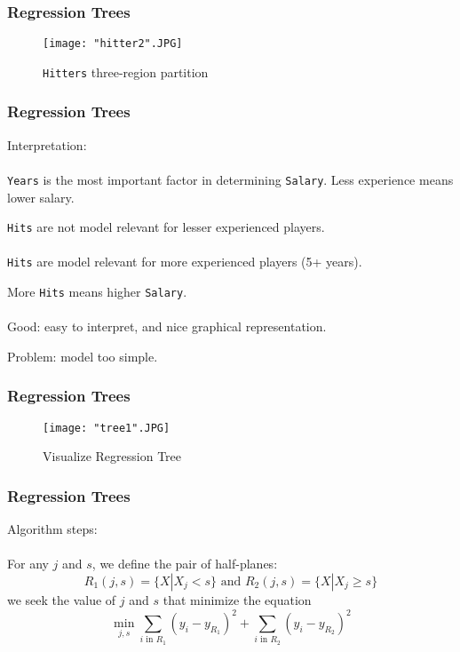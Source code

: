 \documentclass{beamer}
\begin{document}
\begin{frame}
\frametitle{Regression Trees}
\begin{figure}[H]
\caption{\texttt{Hitters} three-region partition}
\texttt{[image: "hitter2".JPG]} 
\end{figure}
\end{frame} 




\begin{frame}
\frametitle{Regression Trees}

Interpretation: 
\\~\\
\texttt{Years} is the most important factor in determining  \texttt{Salary}. Less experience means lower salary.

\texttt{Hits} are not model relevant for lesser experienced players. 
\\~\\
\texttt{Hits} are model relevant for more experienced players (5+ years). 

More \texttt{Hits} means higher \texttt{Salary}.
\\~\\
Good: easy to interpret, and nice graphical representation.

Problem: model too simple.

\end{frame} 



\begin{frame}
\frametitle{Regression Trees}
\begin{figure}[H]
\caption{Visualize Regression Tree}
\texttt{[image: "tree1".JPG]} 
\end{figure}
\end{frame} 







\begin{frame}
\frametitle{Regression Trees}

Algorithm steps:
\\~\\
For any $j$ and $s$, we define the pair of half-planes:
$$ R_1 (j,s) = \{ X|X_j < s \}  \text{ and }  R_2 (j,s) = \{ X|X_j \geq s \}  $$
we seek the value of $j$ and $s$ that minimize the equation
 $$ \min_{j,s}   \sum\limits_{ i \text{ in } R_1 } ( y_i - y_{R_1}  )^2 + \sum\limits_{ i \text{ in } R_2 } ( y_i - y_{R_2}  )^2  $$



\end{frame} 
\end{document}
